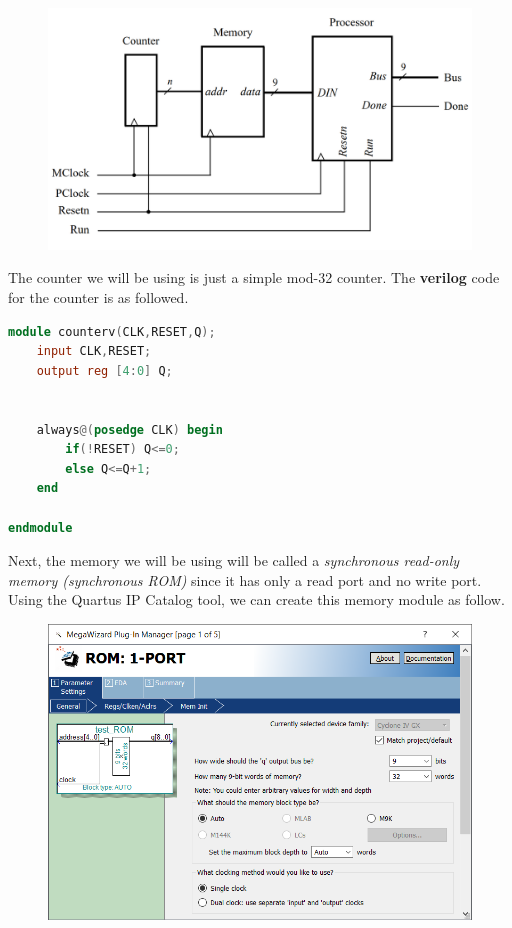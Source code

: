 \begin{figure}[h]
    \centering
    \includegraphics[width=5.5in]{source/picture/Lab09/Simple_Processor_W_Counter.png}
\end{figure}

The counter we will be using is just a simple mod-32 counter. The \textbf{verilog} code for the counter is as followed.

\begin{lstlisting}[language=Verilog]
module counterv(CLK,RESET,Q);
	input CLK,RESET;
	output reg [4:0] Q;
	
	
	always@(posedge CLK) begin
		if(!RESET) Q<=0;
		else Q<=Q+1;
	end
	
endmodule
\end{lstlisting}

Next, the memory we will be using will be called a \textit{synchronous read-only memory (synchronous ROM)} since it has only a read port and no write port. Using the Quartus IP Catalog tool, we can create this memory module as follow.

\begin{figure}[h]
    \centering
    \includegraphics[width = 5.5in]{source/picture/Lab09/Create_ROM_1.png}
\end{figure}

